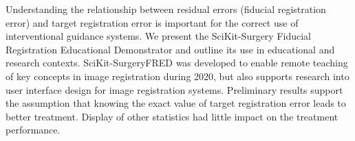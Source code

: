 Understanding the relationship between residual errors (fiducial registration error) and target registration error is important for the correct use of interventional guidance systems. We present the SciKit-Surgery Fiducial Registration Educational Demonstrator and outline its use in educational and research contexts. SciKit-SurgeryFRED was developed to enable remote teaching of key concepts in image registration during 2020, but also supports research into user interface design for image registration systems. Preliminary results support the assumption that knowing the exact value of target registration error leads to better treatment. Display of other statistics had little impact on the treatment performance.  
